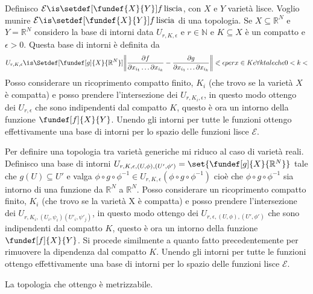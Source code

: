 \begin{defn}
Definisco $\mathcal{E} \is \setdef[\fundef{X}{Y}]{f \, \text{liscia}}$, con $X$ e $Y$ varietà lisce. Voglio munire $\mathcal{E} \is \setdef[\fundef{X}{Y}]{f \, \text{liscia}}$ di una topologia. Se $X \subseteq \mathbb{R}^{N}$ e $Y = \mathbb{R}^{N}$ considero
la base di intorni data $U_{r, K, \epsilon}$ e $r \in \mathbb{N}$ e $K \subseteq X$  è un compatto e $\epsilon > 0$. Questa base di intorni è definita da 
\[U_{r, K, \epsilon} \is \Setdef[{\fundef[g]{X}{\mathbb{R}^{N}}}]{\left\|\frac{\partial f}{\partial x_{i_{1}} \dots \partial x_{i_{k}}} - \frac{\partial g}{\partial x_{i_{1}} \dots \partial x_{i_{k}}}\right\| \eqslantless \epsilon per x \in K e \forall k tale che 0<k<}\]
Posso considerare un ricoprimento compatto finito,  ${K_i}$ (che trovo se la varietà $X$ è compatta) e posso prendere l'intersezione dei $U_{r,K_i, \epsilon}$, in questo modo ottengo
dei $U_{r, \epsilon}$ che sono indipendenti dal compatto $K$, questo è ora un intorno della funzione $\fundef[f]{X}{Y}$. 
Unendo gli intorni per tutte le funzioni ottengo effettivamente una base di intorni per lo spazio delle funzioni lisce $\mathcal{E}$.
\end{defn}


\begin{defn}
Per definire una topologia tra varietà generiche mi riduco al caso di varietà reali.
Definisco una base di intorni $U_{r, K, \epsilon, (U, \phi), (U', \phi')} = \set{\fundef[g]{X}{\mathbb{R}^{N}}}$ tale che $g(U) \subseteq U'$ e valga 
$\phi \circ g \circ \phi^{-1} \in U_{r, K, \epsilon}(\phi \circ g \circ \phi^{-1})$ cioè che $\phi \circ g \circ \phi^{-1}$ sia intorno di una funzione da $\mathbb{R}^{N}$ a $\mathbb{R}^{N}$.
Posso considerare un ricoprimento compatto finito,  ${K_i}$ (che trovo se la varietà X è compatta) e posso prendere l'intersezione dei $U_{r,K_i, (U_i, \psi_i)(U'_i, \psi'_j)}$, in questo modo ottengo
dei $U_{r, \epsilon, (U, \phi), (U', \phi')}$ che sono indipendenti dal compatto $K$, questo è ora un intorno della funzione $\fundef[f]{X}{Y}$. Si procede similmente a quanto fatto precedentemente 
per rimuovere la dipendenza dal compatto $K$.
Unendo gli intorni per tutte le funzioni ottengo effettivamente una base di intorni per lo spazio delle funzioni lisce $\mathcal{E}$.

\end{defn}

\begin{oss}
 La topologia che ottengo è metrizzabile.
\end{oss}







